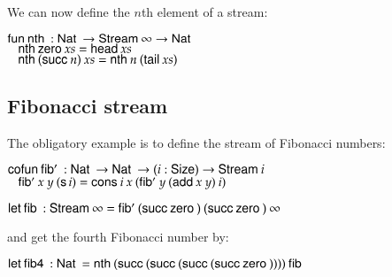 \noindent We can now define the $n$th element of a stream:
\begin{bsp}
$\fun \nth : \Nat \ra \SStream \infty \ra \Nat$\\
$\spc \nth \zero xs = \head xs$\\
$\spc \nth (\suc n) \: xs = \nth n \: (\tail xs)$\\
\end{bsp}
\subsection{Fibonacci stream}

The obligatory example is to define the stream of Fibonacci numbers:
\begin{bsp}
$\cofun \fibs : \Nat \ra \Nat \ra \EPi{i}{\Size}{\SStream i}$\\
$\spc  \fibs x \: y \: (\s i) = \cons i \: x \: (\fibs y \: (\add x \: y) \: i)$

$\clet \fib : \SStream \infty = \fibs (\suc \zero) \: (\suc \zero) \: \infty$
\end{bsp}
and get the fourth Fibonacci number by:
\begin{bsp}
$\clet \fibf : \Nat = \nth (\suc (\suc (\suc (\suc \zero )))) \: \fib$
\end{bsp}

